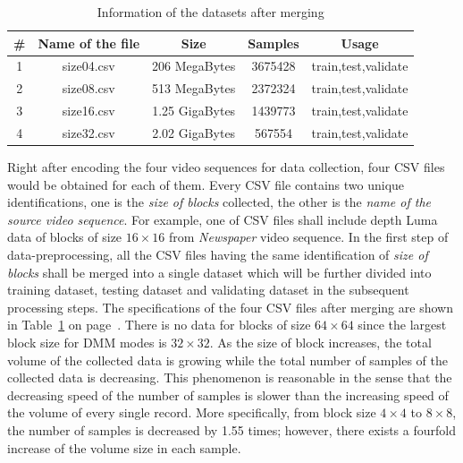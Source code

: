 \begin{table}[H]
    \caption{Information of the datasets after merging}
    \bigskip\label{tab:datasets-after-first-step}
    \centering
    \begin{tabular}{c c c c c}
        \toprule
        \# & Name of the file & Size & Samples & Usage\\
        \midrule
        1 & size04.csv & 206 MegaBytes & 3675428 & train,test,validate\\
        2 & size08.csv & 513 MegaBytes & 2372324 & train,test,validate\\
        3 & size16.csv & 1.25 GigaBytes & 1439773 & train,test,validate\\
        4 & size32.csv & 2.02 GigaBytes & 567554 & train,test,validate\\
        \bottomrule
    \end{tabular}
\end{table}
Right after encoding the four video sequences for data 
collection, four CSV files
would be obtained for each of them.
Every CSV file contains two unique identifications,
one is the \emph{size of blocks} collected, the other is the 
\emph{name of the source video sequence}.
For example, one of CSV files shall include depth 
Luma data of blocks of size \(16\times16\) from
\emph{Newspaper} video sequence.
In the first step of data-preprocessing, all
the CSV files having the same identification of 
\emph{size of blocks} shall be merged into a single dataset
which will be further divided into training dataset,
testing dataset and validating dataset in the subsequent 
processing steps.
The specifications of the four CSV files after merging 
are shown in Table~\ref{tab:datasets-after-first-step}
on page~\pageref{tab:datasets-after-first-step}.
There is no data for blocks of size \(64\times64\)
since the largest block size for DMM modes is \(32\times32\).
As the size of block 
increases, the total volume of the collected data is growing
while the total number of samples of the collected data is
decreasing.
This phenomenon is reasonable in the sense that
the decreasing speed of the number of samples is slower 
than the increasing speed of the volume of every single
record.
More specifically, from block size \(4\times4\) to \(8\times8\),
the number of samples is decreased by 1.55 times; however,
there exists a fourfold increase of the volume size in 
each sample.

